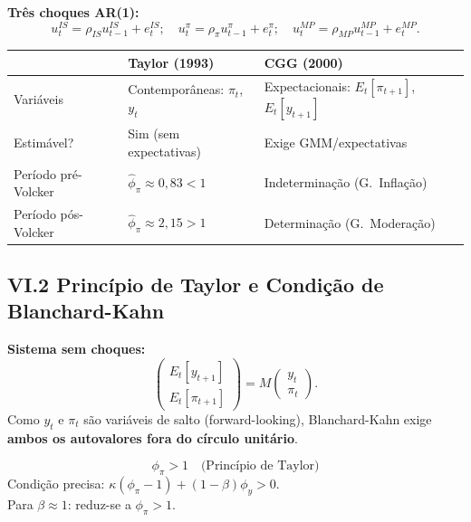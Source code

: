 \documentclass[12pt, a4paper]{article}
\newcommand{\E}{\mathbb{E}}
\begin{document}
\textbf{Três choques AR(1):}
\[
u_t^{IS} = \rho_{IS}u_{t-1}^{IS} + e_t^{IS};\quad u_t^\pi = \rho_\pi u_{t-1}^\pi + e_t^\pi;\quad u_t^{MP} = \rho_{MP}u_{t-1}^{MP} + e_t^{MP}.
\]

\begin{resultbox}[title={Comparação: Regra CGG vs.\ Taylor (1993)}]
\begin{center}
\begin{tabular}{lll}
\toprule
 & Taylor (1993) & CGG (2000) \\
\midrule
Variáveis & Contemporâneas: $\pi_t$, $y_t$ & Expectacionais: $E_t[\pi_{t+1}]$, $E_t[y_{t+1}]$ \\
Estimável? & Sim (sem expectativas) & Exige GMM/expectativas \\
Período pré-Volcker & $\hat{\phi}_\pi \approx 0{,}83 < 1$ & Indeterminação (G.\ Inflação) \\
Período pós-Volcker & $\hat{\phi}_\pi \approx 2{,}15 > 1$ & Determinação (G.\ Moderação) \\
\bottomrule
\end{tabular}
\end{center}
\end{resultbox}

\subsection*{VI.2 Princípio de Taylor e Condição de Blanchard-Kahn}

\textbf{Sistema sem choques:}
\[
\begin{pmatrix}E_t[y_{t+1}]\\E_t[\pi_{t+1}]\end{pmatrix} = M\begin{pmatrix}y_t\\\pi_t\end{pmatrix}.
\]
Como $y_t$ e $\pi_t$ são variáveis de salto (forward-looking), Blanchard-Kahn exige \textbf{ambos os autovalores fora do círculo unitário}.

\begin{resultbox}[title={Princípio de Taylor e Determinação}]
\[
\phi_\pi > 1 \quad\text{(Princípio de Taylor)}
\]
Condição precisa: $\kappa(\phi_\pi-1) + (1-\beta)\phi_y > 0$.\\
Para $\beta\approx 1$: reduz-se a $\phi_\pi > 1$.
\end{resultbox}

\setcounter{section}{0}

\end{document}
